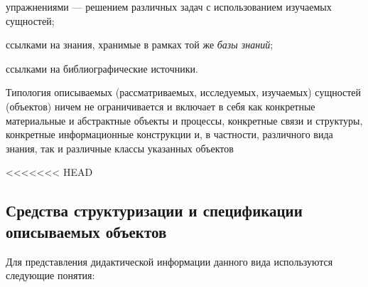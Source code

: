 \begin{SCn}
{\begin{textitemize}
\begin{textitemize}
			\end{textitemize}
			\item упражнениями --- решением различных задач с использованием изучаемых сущностей;
			\item ссылками на знания, хранимые в рамках той же \textit{базы знаний};
			\item ссылками на библиографические источники.
		\end{textitemize}
	Типология описываемых (рассматриваемых, исследуемых, изучаемых) сущностей (объектов) ничем не ограничивается и включает в себя как конкретные материальные и абстрактные объекты и процессы, конкретные связи и структуры, конкретные информационные конструкции и, в частности, различного вида знания, так и различные классы указанных объектов
	}
\end{SCn}

<<<<<<< HEAD
\subsection{Средства структуризации и спецификации описываемых объектов}
\label{subsec_means_detecting_described_objects}
Для представления дидактической информации данного вида используются следующие понятия:

\begin{SCn}
\end{SCn}

\begin{SCn}
\end{SCn}

\begin{SCn}
\end{SCn}

\begin{SCn}
\end{SCn}

\begin{SCn}
\end{SCn}

